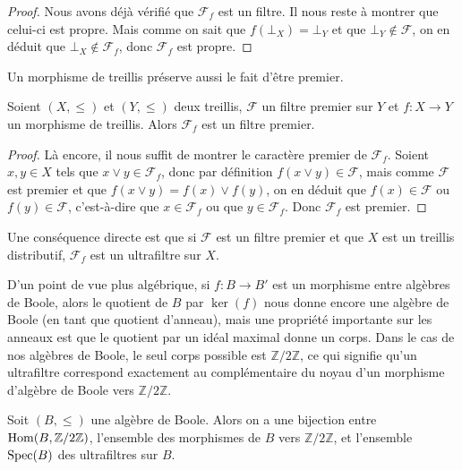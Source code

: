 \begin{proof}
  Nous avons déjà vérifié que $\mathcal F_f$ est un filtre. Il nous reste à
  montrer que celui-ci est propre. Mais comme on sait que $f(\bot_X)=\bot_Y$
  et que $\bot_Y\notin\mathcal F$, on en déduit que $\bot_X\notin\mathcal F_f$,
  donc $\mathcal F_f$ est propre.
\end{proof}

Un morphisme de treillis préserve aussi le fait d'être premier.

\begin{property}
  Soient $(X,\leq)$ et $(Y,\leq)$ deux treillis, $\mathcal F$ un filtre premier
  sur $Y$ et $f : X \to Y$ un morphisme de treillis. Alors $\mathcal F_f$ est un
  filtre premier.
\end{property}

\begin{proof}
  Là encore, il nous suffit de montrer le caractère premier de $\mathcal F_f$.
  Soient $x,y\in X$ tels que $x\lor y \in \mathcal F_f$, donc par définition
  $f(x\lor y)\in \mathcal F$, mais comme $\mathcal F$ est premier et que
  $f(x\lor y) = f(x)\lor f(y)$, on en déduit que $f(x)\in\mathcal F$ ou
  $f(y)\in\mathcal F$, c'est-à-dire que $x\in\mathcal F_f$ ou que
  $y\in\mathcal F_f$. Donc $\mathcal F_f$ est premier.
\end{proof}

Une conséquence directe est que si $\mathcal F$ est un filtre premier et que $X$
est un treillis distributif, $\mathcal F_f$ est un ultrafiltre sur $X$.

D'un point de vue plus algébrique, si $f : B \to B'$ est un morphisme entre
algèbres de Boole, alors le quotient de $B$ par $\ker(f)$ nous donne encore une
algèbre de Boole (en tant que quotient d'anneau), mais une propriété importante
sur les anneaux est que le quotient par un idéal maximal donne un corps. Dans le
cas de nos algèbres de Boole, le seul corps possible est $\mathbb Z/2\mathbb Z$,
ce qui signifie qu'un ultrafiltre correspond exactement au complémentaire du
noyau d'un morphisme d'algèbre de Boole vers $\mathbb Z/2\mathbb Z$.

\begin{proposition}
  Soit $(B,\leq)$ une algèbre de Boole. Alors on a une bijection entre
  $\operatorname{Hom}(B,\mathbb Z/2\mathbb Z)$, l'ensemble des morphismes de $B$ vers
  $\mathbb Z/2\mathbb Z$, et l'ensemble $\operatorname{Spec}(B)$ des ultrafiltres sur $B$.
\end{proposition}

